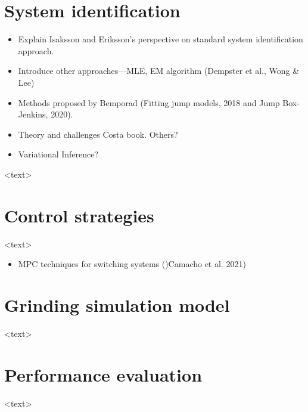 \section{System identification}

\begin{itemize}
	\item Explain Isaksson and Eriksson's perspective on standard system identification approach.
	\item Introduce other approaches—MLE, EM algorithm (Dempster et al., Wong \& Lee)
	\item Methods proposed by Bemporad (Fitting jump models, 2018 and Jump Box-Jenkins, 2020).
	\item Theory and challenges Costa book. Others?
	\item Variational Inference?
\end{itemize}


<text>


\section{Control strategies}

<text>
\begin{itemize}
	\item MPC techniques for switching systems ()Camacho et al. 2021)
\end{itemize}

\section{Grinding simulation model}

<text>


\section{Performance evaluation}
	
<text>

